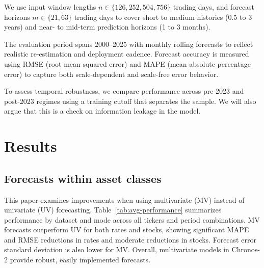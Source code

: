 \documentclass[twocolumn]{article}
\begin{document}
We use input window lengths $n \in \{126, 252, 504, 756\}$ trading days, and forecast horizons $m \in \{21, 63\}$ trading days to cover short to medium histories (0.5 to 3 years) and near- to mid-term prediction horizons (1 to 3 months).

The evaluation period spans 2000--2025 with monthly rolling forecasts to reflect realistic re-estimation and deployment cadence. Forecast accuracy is measured using RMSE (root mean squared error) and MAPE (mean absolute percentage error) to capture both scale-dependent and scale-free error behavior. 

To assess temporal robustness, we compare performance across pre-2023 and post-2023 regimes using a training cutoff that separates the sample. We will also argue that this is a check on information leakage in the model. 

\section{Results}

\subsection{Forecasts within asset classes}

This paper examines improvements when using multivariate (MV) instead of univariate (UV) forecasting. Table~\ref{tab:avg-performance} summarizes performance by dataset and mode across all tickers and period combinations. MV forecasts outperform UV for both rates and stocks, showing significant MAPE and RMSE reductions in rates and moderate reductions in stocks. Forecast error standard deviation is also lower for MV. Overall, multivariate models in Chronos-2 provide robust, easily implemented forecasts.

\begin{table}[H]
\centering
\caption{\label{tab:avg-performance} \small Average performance by dataset and mode. Lower mean error across all experiments (for values of input length $n=\{126, 252, 504, 756\}$, and forecast period $m=\{21, 63\}$) measured by MAPE and RMSE is better. Data for the rolling periods is from 2000 through 2025. Predictions periods begin 3 years after the start of the dataset. }
\end{table}
\end{document}
